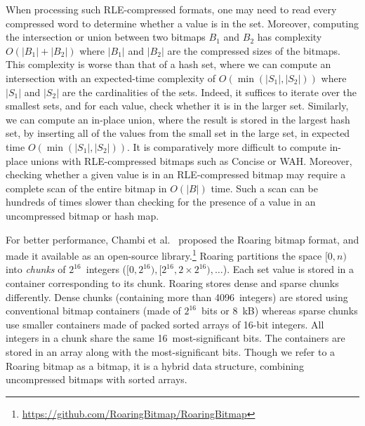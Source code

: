 \documentclass[times]{speauth}
\begin{document}
When processing such RLE-compressed formats, one may need to read
every compressed word to determine whether a value
is in the set. Moreover, computing the
intersection or union between two bitmaps $B_1$ and $B_2$ has complexity
$O(|B_1|+|B_2|)$ where $|B_1|$ and $|B_2|$ are the compressed
sizes of the bitmaps. This complexity is worse than that of
a hash set, where we can compute an intersection with
an expected-time complexity of $O(\min(|S_1|,|S_2|))$ where $|S_1|$ and $|S_2|$ are the cardinalities of the sets.
Indeed, it suffices to iterate over the smallest sets, and for each value, check whether it is in the larger set.
Similarly, we can compute an in-place union, where the result is stored in the largest hash set,  by inserting all
of the values from the small set in the large set, in expected time $O(\min(|S_1|,|S_2|))$. It is comparatively more difficult
to compute in-place unions with RLE-compressed bitmaps such as Concise or WAH\@. Moreover, checking whether a given value is 
in an RLE-compressed bitmap
may require a complete scan of the entire bitmap in $O(|B|)$ time.
Such a scan can be
hundreds of times slower
than checking for the presence of a value in an uncompressed bitmap or hash map.

 For better performance, Chambi et al.~\cite{SPE:SPE2325} proposed the Roaring bitmap format, and made it available as an open-source library.\footnote{\url{https://github.com/RoaringBitmap/RoaringBitmap}}
Roaring partitions the space $[0,n)$ into \emph{chunks} of  $2^{16}$~integers ($[0,2^{16}),[2^{16},2\times 2^{16}), \ldots$).
Each  set value is stored in a container corresponding to its chunk.
 Roaring  stores  dense and sparse chunks  differently.
Dense chunks (containing more than \num{4096}~integers) are stored using conventional bitmap containers (made of $2^{16}$~bits or \SI{8}{kB})
 whereas sparse chunks use smaller containers made of packed sorted arrays of 16-bit integers.
All integers in a chunk share the same 16~most-significant bits. 
The containers are stored in an array along with the most-significant bits.
Though we refer to a Roaring bitmap as a bitmap, it is a hybrid data structure, combining uncompressed bitmaps with sorted arrays.
\end{document}
